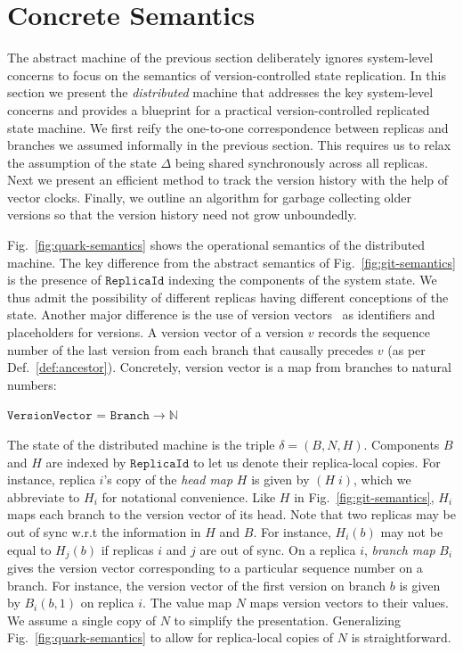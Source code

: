\section{Concrete Semantics}
\label{sec:concrete-sem}



The \quark abstract machine of the previous section deliberately
ignores system-level concerns to focus on the semantics of
version-controlled state replication. In this section we present the
\quark \emph{distributed} machine that addresses the key system-level
concerns and provides a blueprint for a practical version-controlled
replicated state machine. We first reify the one-to-one
correspondence between replicas and branches we assumed informally in
the previous section. This requires us to relax the assumption of the
state $\Delta$ being shared synchronously across all replicas. Next we
present an efficient method to track the version history with the help
of vector clocks. Finally, we outline an algorithm for garbage
collecting older versions so that the version history need not grow
unboundedly.

Fig.~\ref{fig:quark-semantics} shows the operational semantics of the
distributed machine. The key difference from the abstract semantics of
Fig.~\ref{fig:git-semantics} is the presence of $\texttt{ReplicaId}$
indexing the components of the system state. We thus admit the
possibility of different replicas having different conceptions of the
state. Another major difference is the use of version
vectors~\cite{vectorclock} as identifiers and placeholders for
versions. A version vector of a version $v$ records the sequence
number of the last version from each branch that causally precedes $v$
(as per Def.~\ref{def:ancestor}).  Concretely, version vector is a map
from branches to natural numbers:
\begin{center}
  $\texttt{VersionVector}$ = $\texttt{Branch} \rightarrow \mathbb{N}$
\end{center}

The state of the distributed machine is the triple $\delta = (B,N,H)$.
Components $B$ and $H$ are indexed by $\texttt{ReplicaId}$ to let us
denote their replica-local copies. For instance, replica $i$'s copy of
the \emph{head map} $H$ is given by $(H\;i)$, which we abbreviate to
$H_i$ for notational convenience. Like $H$ in
Fig.~\ref{fig:git-semantics}, $H_i$ maps each branch to the version
vector of its head. Note that two replicas may be out of sync w.r.t
the information in $H$ and $B$.  For instance, $H_i(b)$ may not be
equal to $H_j(b)$ if replicas $i$ and $j$ are out of sync. On a
replica $i$, \emph{branch map} $B_i$ gives the version vector
corresponding to a particular sequence number on a branch. For
instance, the version vector of the first version on branch $b$ is
given by $B_i(b,1)$ on replica $i$. The value map $N$ maps version
vectors to their values. We assume a single copy of $N$ to simplify
the presentation. Generalizing Fig.~\ref{fig:quark-semantics} to allow
for replica-local copies of $N$ is straightforward.

